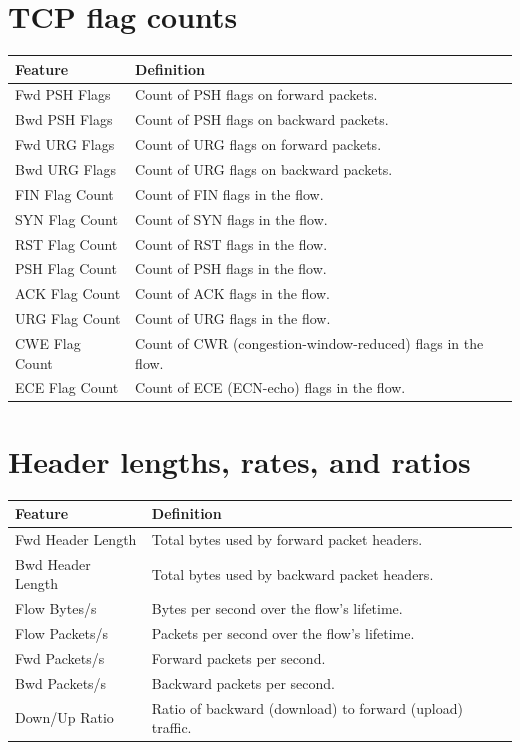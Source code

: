 \section{TCP flag counts}
\label{app:feat_flags}

\begin{tabularx}{\textwidth}{lX}
  \toprule
  \textbf{Feature} & \textbf{Definition} \\
  \midrule
  Fwd PSH Flags   & Count of PSH flags on forward packets. \\
  Bwd PSH Flags   & Count of PSH flags on backward packets. \\
  Fwd URG Flags   & Count of URG flags on forward packets. \\
  Bwd URG Flags   & Count of URG flags on backward packets. \\
  FIN Flag Count  & Count of FIN flags in the flow. \\
  SYN Flag Count  & Count of SYN flags in the flow. \\
  RST Flag Count  & Count of RST flags in the flow. \\
  PSH Flag Count  & Count of PSH flags in the flow. \\
  ACK Flag Count  & Count of ACK flags in the flow. \\
  URG Flag Count  & Count of URG flags in the flow. \\
  CWE Flag Count  & Count of CWR (congestion-window-reduced) flags in the flow. \\
  ECE Flag Count  & Count of ECE (ECN-echo) flags in the flow. \\
  \bottomrule
\end{tabularx}

\section{Header lengths, rates, and ratios}
\label{app:feat_rates}

\begin{tabularx}{\textwidth}{lX}
  \toprule
  \textbf{Feature} & \textbf{Definition} \\
  \midrule
  Fwd Header Length        & Total bytes used by forward packet headers. \\
  Bwd Header Length        & Total bytes used by backward packet headers. \\
  Flow Bytes/s             & Bytes per second over the flow's lifetime. \\
  Flow Packets/s           & Packets per second over the flow's lifetime. \\
  Fwd Packets/s            & Forward packets per second. \\
  Bwd Packets/s            & Backward packets per second. \\
  Down/Up Ratio            & Ratio of backward (download) to forward (upload) traffic. \\
  \bottomrule
\end{tabularx}

